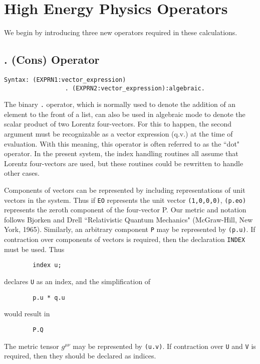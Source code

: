 \section{High Energy Physics Operators}

We begin by introducing three new operators required in these calculations.

\subsection{. (Cons) Operator} 
\begin{verbatim}
Syntax: (EXPRN1:vector_expression)
                 . (EXPRN2:vector_expression):algebraic.
\end{verbatim}
The binary {\tt .} operator, which is normally used to denote the addition
of an element to the front of a list, can also be used in algebraic mode
to denote the scalar product of two Lorentz four-vectors.  For this to
happen, the second argument must be recognizable as a vector expression
 (q.v.) at the time of
evaluation.  With this meaning, this operator is often referred to as the
``dot" operator.  In the present system, the index handling routines all
assume that Lorentz four-vectors are used, but these routines could be
rewritten to handle other cases.

Components of vectors can be represented by including representations of
unit vectors in the system.  Thus if {\tt EO} represents the unit vector
{\tt (1,0,0,0)}, {\tt (p.eo)} represents the zeroth component of the
four-vector P.  Our metric and notation follows Bjorken and Drell
``Relativistic Quantum Mechanics" (McGraw-Hill, New York, 1965).
Similarly, an arbitrary component {\tt P} may be represented by
{\tt (p.u)}.  If contraction over components of vectors is required, then
the declaration {\tt INDEX}  must be used.  Thus
\begin{verbatim}
        index u;
\end{verbatim}
declares {\tt U} as an index, and the simplification of
\begin{verbatim}
        p.u * q.u
\end{verbatim}
would result in
\begin{verbatim}
        P.Q
\end{verbatim}
The metric tensor $g^{\mu \nu}$ may be represented by {\tt (u.v)}.  If
contraction over {\tt U} and {\tt V} is required, then they should be
declared as indices.

